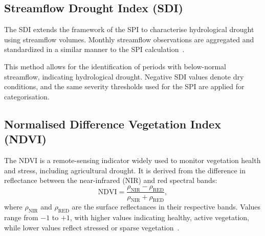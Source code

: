 \subsection{Streamflow Drought Index (SDI)}

The SDI extends the framework of the SPI to characterise hydrological drought using streamflow volumes. Monthly streamflow observations are aggregated and standardized in a similar manner to the SPI calculation~\cite{sdi_seminal_paper}.

This method allows for the identification of periods with below-normal streamflow, indicating hydrological drought. Negative SDI values denote dry conditions, and the same severity thresholds used for the SPI are applied for categorisation.

\subsection{Normalised Difference Vegetation Index (NDVI)}

The NDVI is a remote-sensing indicator widely used to monitor vegetation health and stress, including agricultural drought. It is derived from the difference in reflectance between the near-infrared (NIR) and red spectral bands:
\[
    \text{NDVI} = \frac{\rho_{\text{NIR}} - \rho_{\text{RED}}}{\rho_{\text{NIR}} + \rho_{\text{RED}}},
\]
where $\rho_{\text{NIR}}$ and $\rho_{\text{RED}}$ are the surface reflectances in their respective bands. Values range from $-1$ to $+1$, with higher values indicating healthy, active vegetation, while lower values reflect stressed or sparse vegetation~\cite{ndvi_seminal_paper}.

